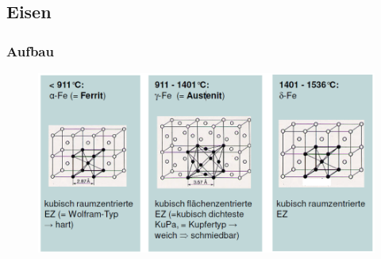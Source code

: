 \subsection{Eisen}
\subsubsection{Aufbau}

\begin{figure}[h!]
	\centering
	\includegraphics[width=0.9\linewidth]{images/3_Aufbau_Eisen.png}
\end{figure}
